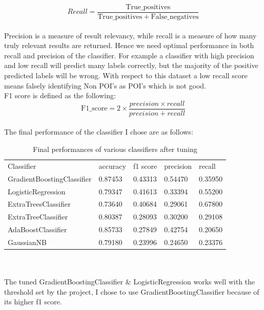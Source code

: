 \documentclass[12pt]{article}%
\begin{document}
\begin{equation}
Recall = \frac{\mathrm{True\_positives}}{\mathrm{True\_positives} + \mathrm{False\_negatives}}
\end{equation}
\\
Precision is a measure of result relevancy, while recall is a measure of how many truly relevant results are returned. Hence we need optimal performance in both recall and precision of the classifier. For example a classifier with high precision and low recall will predict many labels correctly, but the majority of the positive predicted labels will be wrong. With respect to this dataset a low recall score means falsely identifying Non POI's as POI's which is not good.
\\
F1 score is defined as the following:
\begin{equation}
\mathrm{F1\_score} = 2 \times \frac{precision \times recall}{precision + recall}
\end{equation}
\\
The final performance of the classifier I chose are as follows:
\begin{table}[!htb]
\centering
\caption{Final performances of various classifiers after tuning	}
\begin{tabular}{lllll}
 Classifier & accuracy & f1 score & precision & recall \\
 GradientBoostingClassifier & 0.87453 &  0.43313 & 0.54470 & 0.35950 \\
 LogisticRegression & 0.79347 &  0.41613 & 0.33394 & 0.55200 \\
 ExtraTreesClassifier & 0.73640 &  0.40684  & 0.29061 & 0.67800 \\ 
 ExtraTreeClassifier & 0.80387 &  0.28093 & 0.30200 & 0.29108 \\
 AdaBoostClassifier & 0.85733 &  0.27849 & 0.42754 & 0.20650 \\
 GaussianNB & 0.79180 &  0.23996 & 0.24650 & 0.23376 \\
\end{tabular}
\end{table}
\\
\\
The tuned GradientBoostingClassifier \& LogisticRegression works well with the threshold set by the project, I chose to use GradientBoostingClassifier because of its higher f1 score.

\newpage
\end{document}
